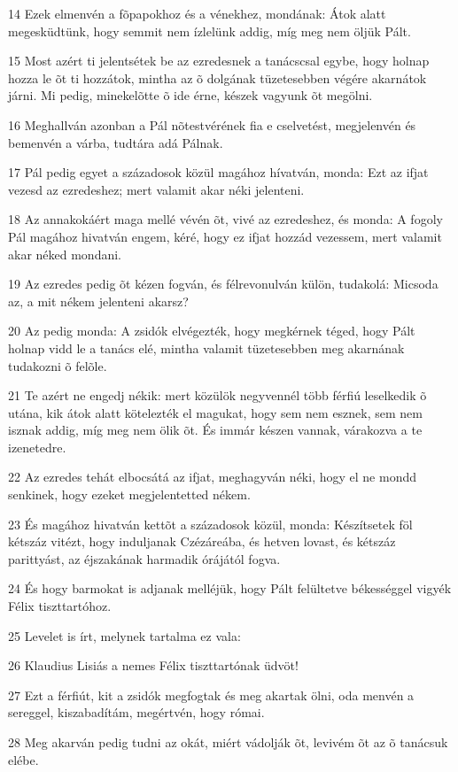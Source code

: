 \par 14 Ezek elmenvén a fõpapokhoz és a vénekhez, mondának: Átok alatt megesküdtünk, hogy semmit nem ízlelünk addig, míg meg nem öljük Pált.
\par 15 Most azért ti jelentsétek be az ezredesnek a tanácscsal egybe, hogy holnap hozza le õt ti hozzátok, mintha az õ dolgának tüzetesebben végére akarnátok járni. Mi pedig, minekelõtte õ ide érne, készek vagyunk õt megölni.
\par 16 Meghallván azonban a Pál nõtestvérének fia e cselvetést, megjelenvén és bemenvén a várba, tudtára adá Pálnak.
\par 17 Pál pedig egyet a századosok közül magához hívatván, monda: Ezt az ifjat vezesd az ezredeshez; mert valamit akar néki jelenteni.
\par 18 Az annakokáért maga mellé vévén õt, vivé az ezredeshez, és monda: A fogoly Pál magához hivatván engem, kéré, hogy ez ifjat hozzád vezessem, mert valamit akar néked mondani.
\par 19 Az ezredes pedig õt kézen fogván, és félrevonulván külön, tudakolá: Micsoda az, a mit nékem jelenteni akarsz?
\par 20 Az pedig monda: A zsidók elvégezték, hogy megkérnek téged, hogy Pált holnap vidd le a tanács elé, mintha valamit tüzetesebben meg akarnának tudakozni õ felõle.
\par 21 Te azért ne engedj nékik: mert közülök negyvennél több férfiú leselkedik õ utána, kik átok alatt kötelezték el magukat, hogy sem nem esznek, sem nem isznak addig, míg meg nem ölik õt. És immár készen vannak, várakozva a te izenetedre.
\par 22 Az ezredes tehát elbocsátá az ifjat, meghagyván néki, hogy el ne mondd senkinek, hogy ezeket megjelentetted nékem.
\par 23 És magához hivatván kettõt a századosok közül, monda: Készítsetek föl kétszáz vitézt, hogy induljanak Czézáreába, és hetven lovast, és kétszáz parittyást, az éjszakának harmadik órájától fogva.
\par 24 És hogy barmokat is adjanak melléjük, hogy Pált felültetve békességgel vigyék Félix tiszttartóhoz.
\par 25 Levelet is írt, melynek tartalma ez vala:
\par 26 Klaudius Lisiás a nemes Félix tiszttartónak üdvöt!
\par 27 Ezt a férfiút, kit a zsidók megfogtak és meg akartak ölni, oda menvén a sereggel, kiszabadítám, megértvén, hogy római.
\par 28 Meg akarván pedig tudni az okát, miért vádolják õt, levivém õt az õ tanácsuk elébe.
